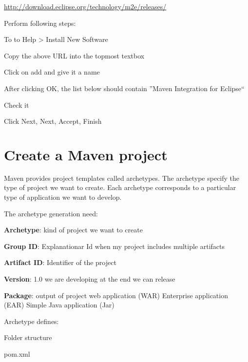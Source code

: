 \documentclass{article}
\begin{document}
\url{http://download.eclipse.org/technology/m2e/releases/}

Perform following steps:
\begin{compactitem}
\item To to Help > Install New Software
\item Copy the above URL into the topmost textbox
\item Click on add and give it a name
\item After clicking OK, the list below should contain ''Maven Integration for Eclipse``
\item Check it
\item Click Next, Next, Accept, Finish
\end{compactitem}

\section{Create a Maven project}
Maven provides project templates called archetypes. The archetype
specify the type of project we want to create. Each archetype
corresponds to a particular type of application we want to develop.

The archetype generation need:
\begin{compactitem}
\item \textbf{Archetype}: kind of project we want to create
\item \textbf{Group ID}: Explanationar Id when my project includes multiple artifacts
\item \textbf{Artifact ID}: Identifier of the project
\item \textbf{Version}: 1.0 we are developing at the end we can release
\item \textbf{Package}: output of project web application (WAR) Enterprise application (EAR) Simple Java application (Jar)
\end{compactitem}

Archetype defines:
\begin{compactitem}
\item Folder structure
\item pom.xml
\end{compactitem}
\end{document}
